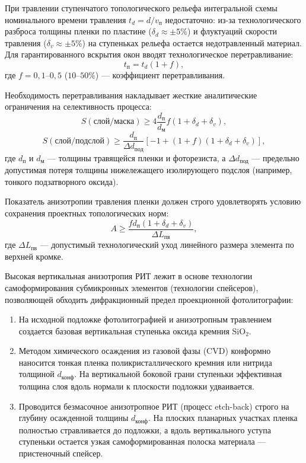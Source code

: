 \documentclass[12pt,a4paper]{article}
\theoremstyle{plain}
\theoremstyle{definition}
\theoremstyle{remark}
\numberwithin{equation}{section}
\begin{document}
При травлении ступенчатого топологического рельефа интегральной схемы номинального времени травления $t_d = d / v_\text{п}$ недостаточно: из-за технологического разброса толщины пленки по пластине ($\delta_d \approx \pm 5\%$) и флуктуаций скорости травления ($\delta_v \approx \pm 5\%$) на ступеньках рельефа остается недотравленный материал. Для гарантированного вскрытия окон вводят технологическое перетравливание:
\begin{equation*}
  t_\text{п} = t_d (1 + f),
\end{equation*}
где $f = 0{,}1\text{--}0{,}5$ ($10\text{--}50\%$) — коэффициент перетравливания. 

Необходимость перетравливания накладывает жесткие аналитические ограничения на селективность процесса:
\begin{equation*}
  S(\text{слой}/\text{маска}) \ge 4 \frac{d_\text{п}}{d_\text{м}} f (1 + \delta_d + \delta_v),
\end{equation*}
\begin{equation*}
  S(\text{слой}/\text{подслой}) \ge \frac{d_\text{п}}{\Delta d_\text{под}} \left[-1 + (1 + f)(1 + \delta_d + \delta_v)\right],
\end{equation*}
где $d_\text{п}$ и $d_\text{м}$ — толщины травящейся пленки и фоторезиста, а $\Delta d_\text{под}$ — предельно допустимая потеря толщины нижележащего изолирующего подслоя (например, тонкого подзатворного оксида).

Показатель анизотропии травления пленки должен строго удовлетворять условию сохранения проектных топологических норм:
\begin{equation*}
  A \ge \frac{f d_\text{п} (1 + \delta_d + \delta_v)}{\Delta L_\text{пв}},
\end{equation*}
где $\Delta L_\text{пв}$ — допустимый технологический уход линейного размера элемента по верхней кромке.

Высокая вертикальная анизотропия РИТ лежит в основе технологии самоформирования субмикронных элементов (технологии спейсеров), позволяющей обходить дифракционный предел проекционной фотолитографии:
\begin{enumerate}
  \item На исходной подложке фотолитографией и анизотропным травлением создается базовая вертикальная ступенька оксида кремния $\mathrm{SiO}_2$.
  \item Методом химического осаждения из газовой фазы (CVD) конформно наносится тонкая пленка поликристаллического кремния или нитрида толщиной $d_\text{конф}$. На вертикальной боковой грани ступеньки эффективная толщина слоя вдоль нормали к плоскости подложки удваивается.
  \item Проводится безмасочное анизотропное РИТ (процесс etch-back) строго на глубину осажденной толщины $d_\text{конф}$. На плоских планарных участках пленка полностью стравливается до подложки, а вдоль вертикального уступа ступеньки остается узкая самоформированная полоска материала — пристеночный спейсер.
\end{enumerate}
\end{document}
